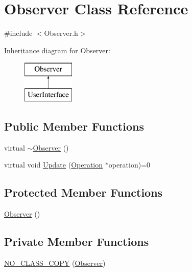 \section{Observer Class Reference}
\label{class_observer}


{\ttfamily \#include $<$Observer.\-h$>$}

Inheritance diagram for Observer\-:\begin{figure}[H]
\begin{center}
\leavevmode
\includegraphics[height=2.000000cm]{class_observer}
\end{center}
\end{figure}
\subsection*{Public Member Functions}
\begin{DoxyCompactItemize}
\item 
virtual \hyperlink{class_observer_afcc6b67be6c386f2f3d2c363aa59cb47}{$\sim$\-Observer} ()
\item 
virtual void \hyperlink{class_observer_a6ee3bd29c7e16ce4d5208f39f09776ba}{Update} (\hyperlink{class_operation}{Operation} $\ast$operation)=0
\end{DoxyCompactItemize}
\subsection*{Protected Member Functions}
\begin{DoxyCompactItemize}
\item 
\hyperlink{class_observer_a19c43f80a38a332a6f694783df3c9835}{Observer} ()
\end{DoxyCompactItemize}
\subsection*{Private Member Functions}
\begin{DoxyCompactItemize}
\item 
\hyperlink{class_observer_a602ac85aafab6c5684ca2cf6ef322ec1}{N\-O\-\_\-\-C\-L\-A\-S\-S\-\_\-\-C\-O\-P\-Y} (\hyperlink{class_observer}{Observer})
\end{DoxyCompactItemize}


